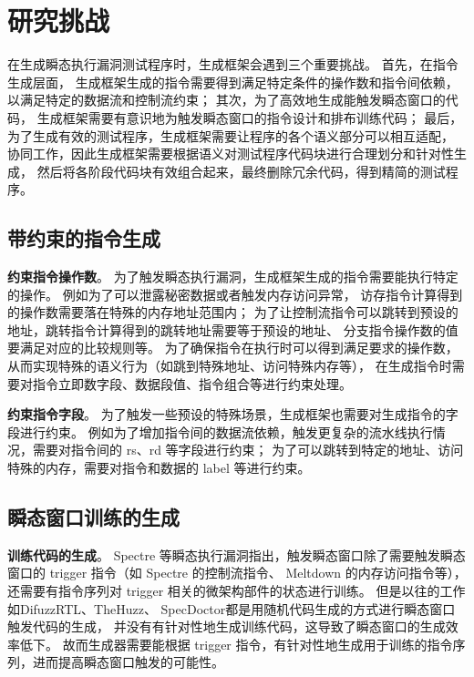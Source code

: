 \cleardoublepage
\section{研究挑战}

在生成瞬态执行漏洞测试程序时，生成框架会遇到三个重要挑战。
首先，在指令生成层面，
生成框架生成的指令需要得到满足特定条件的操作数和指令间依赖，
以满足特定的数据流和控制流约束；
其次，为了高效地生成能触发瞬态窗口的代码，
生成框架需要有意识地为触发瞬态窗口的指令设计和排布训练代码；
最后，为了生成有效的测试程序，生成框架需要让程序的各个语义部分可以相互适配，
协同工作，因此生成框架需要根据语义对测试程序代码块进行合理划分和针对性生成，
然后将各阶段代码块有效组合起来，最终删除冗余代码，得到精简的测试程序。\par

\subsection{带约束的指令生成}
\textbf{约束指令操作数}。
为了触发瞬态执行漏洞，生成框架生成的指令需要能执行特定的操作。
例如为了可以泄露秘密数据或者触发内存访问异常，
访存指令计算得到的操作数需要落在特殊的内存地址范围内；
为了让控制流指令可以跳转到预设的地址，跳转指令计算得到的跳转地址需要等于预设的地址、
分支指令操作数的值要满足对应的比较规则等。
为了确保指令在执行时可以得到满足要求的操作数，从而实现特殊的语义行为（如跳到特殊地址、访问特殊内存等），
在生成指令时需要对指令立即数字段、数据段值、指令组合等进行约束处理。\par

\textbf{约束指令字段}。
为了触发一些预设的特殊场景，生成框架也需要对生成指令的字段进行约束。
例如为了增加指令间的数据流依赖，触发更复杂的流水线执行情况，需要对指令间的 rs、rd 等字段进行约束；
为了可以跳转到特定的地址、访问特殊的内存，需要对指令和数据的 label 等进行约束。\par

\subsection{瞬态窗口训练的生成}
\textbf{训练代码的生成}。
Spectre 等瞬态执行漏洞指出，触发瞬态窗口除了需要触发瞬态窗口的 trigger 指令（如 Spectre 的控制流指令、
Meltdown 的内存访问指令等），还需要有指令序列对 trigger 相关的微架构部件的状态进行训练。
但是以往的工作如DifuzzRTL\cite{hur2021difuzzrtl}、TheHuzz\cite{kande2022thehuzz}、
SpecDoctor\cite{hur2022specdoctor}都是用随机代码生成的方式进行瞬态窗口触发代码的生成，
并没有有针对性地生成训练代码，这导致了瞬态窗口的生成效率低下。
故而生成器需要能根据 trigger 指令，有针对性地生成用于训练的指令序列，进而提高瞬态窗口触发的可能性。\par

